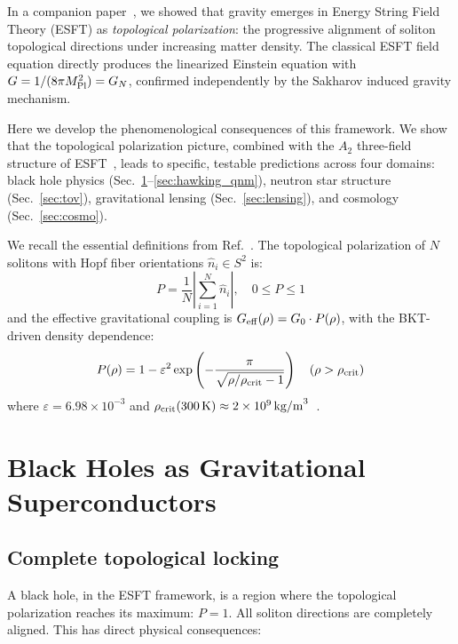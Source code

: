 ﻿\documentclass[twocolumn,preprintnumbers,amsmath,amssymb,prd]{revtex4-2}
\begin{document}
In a companion paper~\cite{Paper6}, we showed that gravity emerges in Energy String Field Theory (ESFT) as \emph{topological polarization}: the progressive alignment of soliton topological directions under increasing matter density. The classical ESFT field equation directly produces the linearized Einstein equation with $G = 1/(8\pi M_{\rm Pl}^2) = G_N$, confirmed independently by the Sakharov induced gravity mechanism.

Here we develop the phenomenological consequences of this framework. We show that the topological polarization picture, combined with the $A_2$ three-field structure of ESFT~\cite{Paper1,Paper2}, leads to specific, testable predictions across four domains: black hole physics (Sec.~\ref{sec:bh}--\ref{sec:hawking_qnm}), neutron star structure (Sec.~\ref{sec:tov}), gravitational lensing (Sec.~\ref{sec:lensing}), and cosmology (Sec.~\ref{sec:cosmo}).

We recall the essential definitions from Ref.~\cite{Paper6}. The topological polarization of $N$ solitons with Hopf fiber orientations $\hat{n}_i \in S^2$ is:
\begin{equation}
P = \frac{1}{N}\left|\sum_{i=1}^N \hat{n}_i\right|, \quad 0 \leq P \leq 1
\label{eq:polarization}
\end{equation}
and the effective gravitational coupling is $G_{\rm eff}(\rho) = G_0 \cdot P(\rho)$, with the BKT-driven density dependence:
\begin{equation}
P(\rho) = 1 - \varepsilon^2\exp\left(-\frac{\pi}{\sqrt{\rho/\rho_{\rm crit} - 1}}\right) \quad (\rho > \rho_{\rm crit})
\label{eq:P_above}
\end{equation}
where $\varepsilon = 6.98 \times 10^{-3}$ and $\rho_{\rm crit}(300\,\text{K}) \approx 2 \times 10^9\,\text{kg/m}^3$~\cite{Paper4}.

\section{Black Holes as Gravitational Superconductors}
\label{sec:bh}

\subsection{Complete topological locking}

A black hole, in the ESFT framework, is a region where the topological polarization reaches its maximum: $P = 1$. All soliton directions are completely aligned. This has direct physical consequences:
\end{document}
